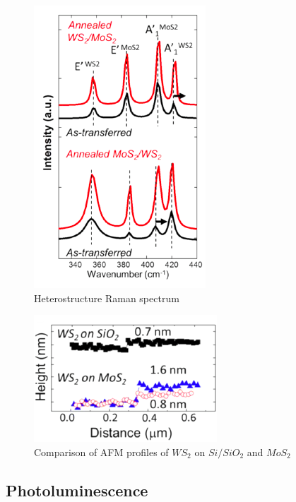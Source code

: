 \begin{figure}[h]
	\begin{center}
		\includegraphics[scale=0.7]{Heterostructures/HeterostructureRamanSpectrumIntro.png}
		\caption{Heterostructure Raman spectrum}
		\label{fig:HeterostructureRamanSpectrumIntro}
	\end{center}
\end{figure}

\begin{figure}[h]
	\begin{center}
		\includegraphics[scale=1]{Heterostructures/HeterostructureAFMProfile.png}
		\caption{Comparison of AFM profiles of $WS_2$ on $Si/SiO_2$ and $MoS_2$}
		\label{fig:HeterostructureAFMProfile}
	\end{center}
\end{figure}


\subsection{Photoluminescence}

